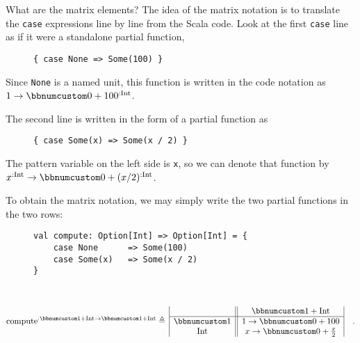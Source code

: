 What are the matrix elements? The idea of the matrix notation is to
translate the \lstinline!case! expressions line by line from the
Scala code. Look at the first \lstinline!case! line as if it were
a standalone partial function,

\begin{wrapfigure}{l}{0.5\columnwidth}%
\vspace{-0.85\baselineskip}
\begin{lstlisting}
{ case None => Some(100) }
\end{lstlisting}

\vspace{-0.75\baselineskip}
\end{wrapfigure}%

\noindent Since \lstinline!None! is a named unit, this function is
written in the code notation as $1\rightarrow\bbnum 0+100^{:\text{Int}}$. 

The second line is written in the form of a partial function as

\begin{wrapfigure}{l}{0.5\columnwidth}%
\vspace{-0.85\baselineskip}
\begin{lstlisting}
{ case Some(x) => Some(x / 2) }
\end{lstlisting}

\vspace{-0.75\baselineskip}
\end{wrapfigure}%

\noindent The pattern variable on the left side is \lstinline!x!,
so we can denote that function by $x^{:\text{Int}}\rightarrow\bbnum 0+(x/2)^{:\text{Int}}$. 

To obtain the matrix notation, we may simply write the two partial
functions in the two rows:

\begin{wrapfigure}{l}{0.5\columnwidth}%
\vspace{-0.85\baselineskip}
\begin{lstlisting}
val compute: Option[Int] => Option[Int] = {
    case None      => Some(100)
    case Some(x)   => Some(x / 2)
}
\end{lstlisting}

\vspace{-0.75\baselineskip}
\end{wrapfigure}%

~\vspace{-1.35\baselineskip}
\[
\text{compute}^{:\bbnum 1+\text{Int}\rightarrow\bbnum 1+\text{Int}}\triangleq\,\begin{array}{|c||c|}
 & \bbnum 1+\text{Int}\\
\hline \bbnum 1 & 1\rightarrow\bbnum 0+100\\
\text{Int} & x\rightarrow\bbnum 0+\frac{x}{2}
\end{array}\quad.
\]
\vspace{-0.9\baselineskip}

